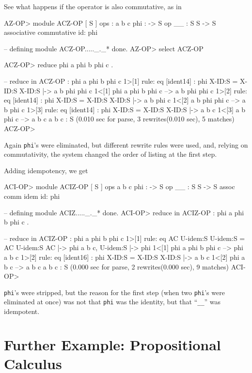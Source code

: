 \documentclass[a4paper]{memoir}
\begin{document}
See what happens if the operator is also commutative, as in
\label{exs:acz-op}
\begin{vvtm}
\begin{ccode}
  AZ-OP> module ACZ-OP {
    [ S ]
    ops : a b c phi : -> S
    op __ : S S -> S { associative commutative id: phi }
  }

  -- defining module ACZ-OP....._._* done.
  AZ-OP> select ACZ-OP

  ACZ-OP> reduce phi a phi b phi c .

  -- reduce in ACZ-OP : phi a phi b phi c
  1>[1] rule: eq [ident14] : phi X-ID:S = X-ID:S
      { X-ID:S |-> a b phi phi c }
  1<[1] phi a phi b phi c --> a b phi phi c
  1>[2] rule: eq [ident14] : phi X-ID:S = X-ID:S
      { X-ID:S |-> a b phi c }
  1<[2] a b phi phi c --> a b phi c
  1>[3] rule: eq [ident14] : phi X-ID:S = X-ID:S
      { X-ID:S |-> a b c }
  1<[3] a b phi c --> a b c
  a b c : S
  (0.010 sec for parse, 3 rewrites(0.010 sec), 5 matches)
  ACZ-OP> 
\end{ccode}
\end{vvtm}
Again \verb|phi|'s were eliminated, but different rewrite rules
were used, and, relying on commutativity, the system changed
the order of listing at the first step.

Adding idempotency, we get\label{exs:aciz-op}
\begin{vvtm}
\begin{ccode}
  ACI-OP> module ACIZ-OP {
    [ S ]
    ops a b c phi : -> S
    op __ : S S -> S { assoc comm idem id: phi }
  }

  -- defining module ACIZ....._._* done.
  ACI-OP> reduce in ACIZ-OP : phi a phi b phi c .

  -- reduce in ACIZ-OP : phi a phi b phi c
  1>[1] rule: eq AC U-idem:S U-idem:S = AC U-idem:S
      { AC |-> phi a b c, U-idem:S |-> phi }
  1<[1] phi a phi b phi c --> phi a b c
  1>[2] rule: eq [ident16] : phi X-ID:S = X-ID:S
      { X-ID:S |-> a b c }
  1<[2] phi a b c --> a b c
  a b c : S
  (0.000 sec for parse, 2 rewrites(0.000 sec), 9 matches)
  ACI-OP> 
\end{ccode}
\end{vvtm}
\verb|phi|'s were stripped, but the reason for the first step
(when two \verb|phi|'s were eliminated at once) was not that
\verb|phi| was the identity, but that ``\verb|__|'' was
idempotent.

\section{Further Example: Propositional Calculus}
\label{sec:p2-propositional-calc}
\end{document}
